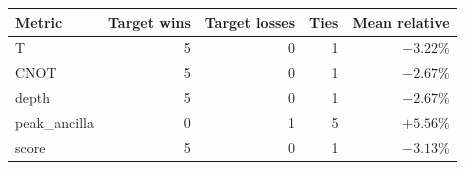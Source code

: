 \begin{tabular}{lrrrr}
\toprule
Metric & Target wins & Target losses & Ties & Mean relative \\
\midrule
T & 5 & 0 & 1 & $-3.22\%$ \\
CNOT & 5 & 0 & 1 & $-2.67\%$ \\
depth & 5 & 0 & 1 & $-2.67\%$ \\
peak_ancilla & 0 & 1 & 5 & $+5.56\%$ \\
score & 5 & 0 & 1 & $-3.13\%$ \\
\bottomrule
\end{tabular}
